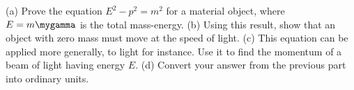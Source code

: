 (a) Prove the equation $E^2-p^2=m^2$ for a material object,
where $E=m\mygamma$ is the total mass-energy. \hwendpart
(b) Using this result,
show that an object with zero mass must move at the speed of
light.\hwendpart
 (c) This equation can be applied more generally, to
light for instance.  Use it to find the momentum of a beam
of light having energy $E$. \answercheck\hwendpart
(d) Convert your answer from the
previous part into ordinary units.\answercheck\hwendpart
